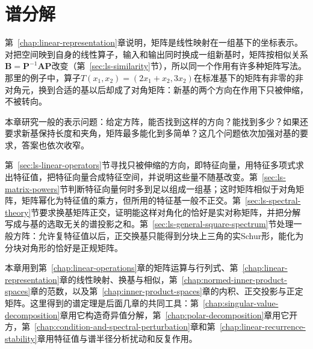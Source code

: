 \chapter{谱分解}
\label{chap:eigen-spectral-decomposition}
\label{chap:linear-analysis}
\label{chap:matrix-analysis}

第~\ref{chap:linear-representation}章说明，矩阵是线性映射在一组基下的坐标表示。对把空间映到自身的线性算子，输入和输出同时换成一组新基时，矩阵按相似关系$\bm B=\bm P^{-1}\bm A\bm P$改变（第~\ref{sec:ls-similarity}节），所以同一个作用有许多种矩阵写法。那里的例子中，算子$T(x_1,x_2)=(2x_1+x_2,3x_2)$在标准基下的矩阵有非零的非对角元，换到合适的基以后却成了对角矩阵：新基的两个方向在作用下只被伸缩，不被转向。

本章研究一般的表示问题：给定方阵，能否找到这样的方向？能找到多少？如果还要求新基保持长度和夹角，矩阵最多能化到多简单？这几个问题依次加强对基的要求，答案也依次收窄。

第~\ref{sec:ls-linear-operators}节寻找只被伸缩的方向，即特征向量，用特征多项式求出特征值，把特征向量合成特征空间，并说明这些量不随基改变。第~\ref{sec:ls-matrix-powers}节判断特征向量何时多到足以组成一组基；这时矩阵相似于对角矩阵，矩阵幂化为特征值的乘方，但所用的特征基一般不正交。第~\ref{sec:ls-spectral-theory}节要求换基矩阵正交，证明能这样对角化的恰好是实对称矩阵，并把分解写成与基的选取无关的谱投影之和。第~\ref{sec:ls-general-square-spectrum}节处理一般方阵：允许复特征值以后，正交换基只能得到分块上三角的实Schur形，能化为分块对角形的恰好是正规矩阵。

本章用到第~\ref{chap:linear-operations}章的矩阵运算与行列式、第~\ref{chap:linear-representation}章的线性映射、换基与相似，第~\ref{chap:normed-inner-product-spaces}章的范数，以及第~\ref{chap:inner-product-spaces}章的内积、正交投影与正定矩阵。这里得到的谱定理是后面几章的共同工具：第~\ref{chap:singular-value-decomposition}章用它构造奇异值分解，第~\ref{chap:polar-decomposition}章用它开方，第~\ref{chap:condition-and-spectral-perturbation}章和第~\ref{chap:linear-recurrence-stability}章用特征值与谱半径分析扰动和反复作用。






